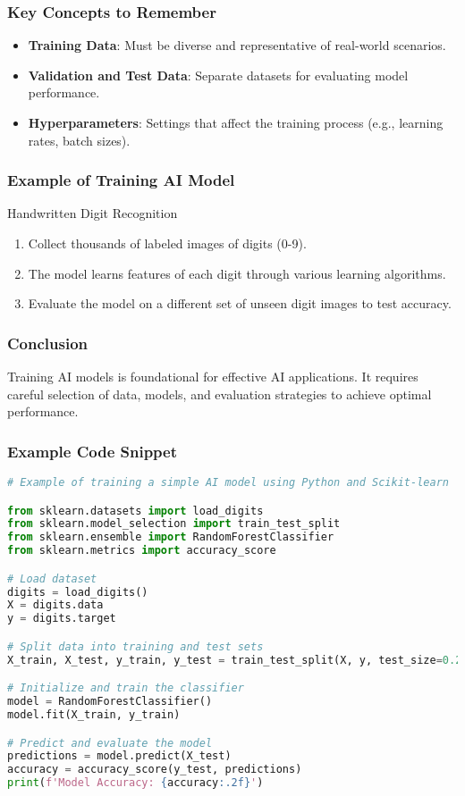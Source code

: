 \documentclass{beamer}
\begin{document}
\begin{frame}[fragile]
    \frametitle{Key Concepts to Remember}
    \begin{itemize}
        \item \textbf{Training Data}: Must be diverse and representative of real-world scenarios.
        \item \textbf{Validation and Test Data}: Separate datasets for evaluating model performance.
        \item \textbf{Hyperparameters}: Settings that affect the training process (e.g., learning rates, batch sizes).
    \end{itemize}
\end{frame}

\begin{frame}[fragile]
    \frametitle{Example of Training AI Model}
    \begin{block}{Handwritten Digit Recognition}
        \begin{enumerate}
            \item Collect thousands of labeled images of digits (0-9).
            \item The model learns features of each digit through various learning algorithms.
            \item Evaluate the model on a different set of unseen digit images to test accuracy.
        \end{enumerate}
    \end{block}
\end{frame}

\begin{frame}[fragile]
    \frametitle{Conclusion}
    Training AI models is foundational for effective AI applications. It requires careful selection of data, models, and evaluation strategies to achieve optimal performance. 
\end{frame}

\begin{frame}[fragile]
    \frametitle{Example Code Snippet}
    \begin{lstlisting}[language=Python]
# Example of training a simple AI model using Python and Scikit-learn

from sklearn.datasets import load_digits
from sklearn.model_selection import train_test_split
from sklearn.ensemble import RandomForestClassifier
from sklearn.metrics import accuracy_score

# Load dataset
digits = load_digits()
X = digits.data
y = digits.target

# Split data into training and test sets
X_train, X_test, y_train, y_test = train_test_split(X, y, test_size=0.2, random_state=42)

# Initialize and train the classifier
model = RandomForestClassifier()
model.fit(X_train, y_train)

# Predict and evaluate the model
predictions = model.predict(X_test)
accuracy = accuracy_score(y_test, predictions)
print(f'Model Accuracy: {accuracy:.2f}')
    \end{lstlisting}
\end{frame}
\end{document}
